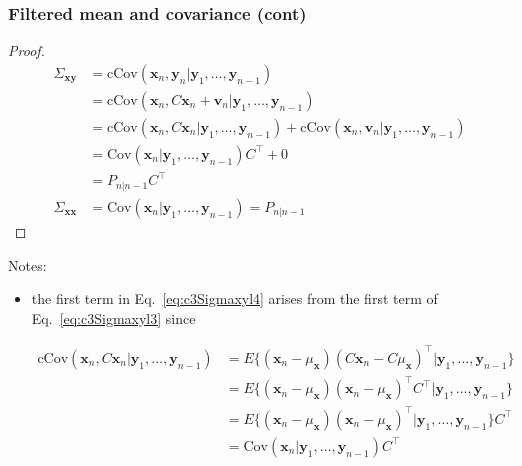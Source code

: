 \begin{frame}
    \frametitle{Filtered mean and covariance (cont)}
    \scriptsize

    \begin{proof}\renewcommand{\qedsymbol}{}
    \begin{align}
        \Sigma_{\mathbf{x}\mathbf{y}}&=\text{cCov}(\mathbf{x}_n,\mathbf{y}_n|\mathbf{y}_1,\ldots,\mathbf{y}_{n-1})\nonumber\\
                                     &=\text{cCov}(\mathbf{x}_n,C\mathbf{x}_n+\mathbf{v}_n|\mathbf{y}_1,\ldots,\mathbf{y}_{n-1})\nonumber\\
                                     &=\text{cCov}(\mathbf{x}_n,C\mathbf{x}_n|\mathbf{y}_1,\ldots,\mathbf{y}_{n-1})+\text{cCov}(\mathbf{x}_n,\mathbf{v}_n|\mathbf{y}_1,\ldots,\mathbf{y}_{n-1})\label{eq:c3Sigmaxyl3}\\
                                     &=\text{Cov}(\mathbf{x}_n|\mathbf{y}_1,\ldots,\mathbf{y}_{n-1})C^\intercal+0\label{eq:c3Sigmaxyl4}\\
                                     &=P_{n|n-1}C^\intercal\label{eq:sigmaxy}\\
        \Sigma_{\mathbf{x}\mathbf{x}}&=\text{Cov}(\mathbf{x}_n|\mathbf{y}_1,\ldots,\mathbf{y}_{n-1})=P_{n|n-1}\label{eq:sigmaxx}
    \end{align}
    \end{proof}

    Notes:

    \begin{itemize}
        \item the first term in Eq.~\ref{eq:c3Sigmaxyl4} arises from the first
            term of Eq.~\ref{eq:c3Sigmaxyl3} since

            \begin{align*}
                \text{cCov}(\mathbf{x}_n,C\mathbf{x}_n|\mathbf{y}_1,\ldots,\mathbf{y}_{n-1})&=E\{(\mathbf{x}_n-\mu_\mathbf{x})(C\mathbf{x}_n-C\mu_{\mathbf{x}})^\intercal|\mathbf{y}_1,\ldots,\mathbf{y}_{n-1}\}\\
                                                                                            &=E\{(\mathbf{x}_n-\mu_\mathbf{x})(\mathbf{x}_n-\mu_{\mathbf{x}})^\intercal C^\intercal|\mathbf{y}_1,\ldots,\mathbf{y}_{n-1}\}\\
                                                                                            &=E\{(\mathbf{x}_n-\mu_\mathbf{x})(\mathbf{x}_n-\mu_{\mathbf{x}})^\intercal|\mathbf{y}_1,\ldots,\mathbf{y}_{n-1}\}C^\intercal\\
                                                                                            &=\text{Cov}(\mathbf{x}_n|\mathbf{y}_1,\ldots,\mathbf{y}_{n-1})C^\intercal
            \end{align*}

    \end{itemize}
\end{frame}

